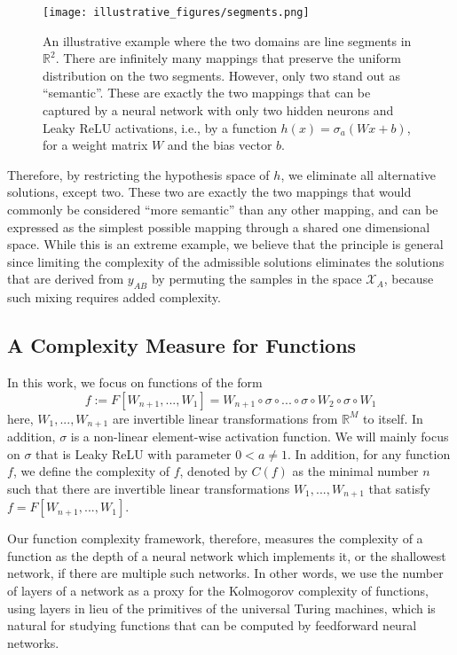 \documentclass{article} %
\begin{document}
\begin{figure}[t]
\begin{centering}
\texttt{[image: illustrative\_figures/segments.png]}
\end{centering}

\caption{\label{fig:toy} An illustrative example where the two domains are line segments in $\mathbb{R}^2$. There are infinitely many mappings that preserve the uniform distribution on the two segments. However, only two stand out as ``semantic''. These are exactly the two mappings that can be captured by a neural network with only two hidden neurons and Leaky ReLU activations, i.e., by a function  $h(x) = \sigma_a(Wx+b)$, for a weight matrix $W$ and the bias vector $b$.}
\end{figure}

Therefore, by restricting the hypothesis space of $h$, we eliminate all alternative solutions, except two. These two are exactly the two mappings that would commonly be considered ``more semantic'' than any other mapping, and can be expressed as the simplest possible mapping through a shared one dimensional space. While this is an extreme example, we believe that the principle is general since 
limiting the complexity of the admissible solutions eliminates the solutions that are derived from $y_{AB}$ by permuting the samples in the space $\mathcal X_A$, because such mixing requires added complexity.

\subsection{A Complexity Measure for Functions}\label{sec:complexMeasure1}

In this work, we focus on functions of the form 
\begin{equation}
f := F[W_{n+1},...,W_1] = W_{n+1} \circ \sigma \circ ... \circ \sigma \circ W_2 \circ \sigma \circ W_1
\end{equation}
here, $W_1,...,W_{n+1}$ are invertible linear transformations from $\mathbb{R}^M$ to itself. In addition, $\sigma$ is a non-linear element-wise activation function. We will mainly focus on $\sigma$ that is Leaky ReLU with parameter $0< a \neq 1$. In addition, for any function $f$, we define the complexity of $f$, denoted by $C(f)$ as the minimal number $n$ such that there are invertible linear transformations $W_1,...,W_{n+1}$ that satisfy $f = F[W_{n+1},...,W_1]$.

Our function complexity framework, therefore, measures the complexity of a function as the depth of a neural network which implements it, or  the shallowest network, if there are multiple such networks. In other words, we use the number of layers of a network as a proxy for the Kolmogorov complexity of functions,  using layers in lieu of the primitives of the universal Turing machines, which is natural for studying functions that can be computed by feedforward neural networks.
\end{document}
